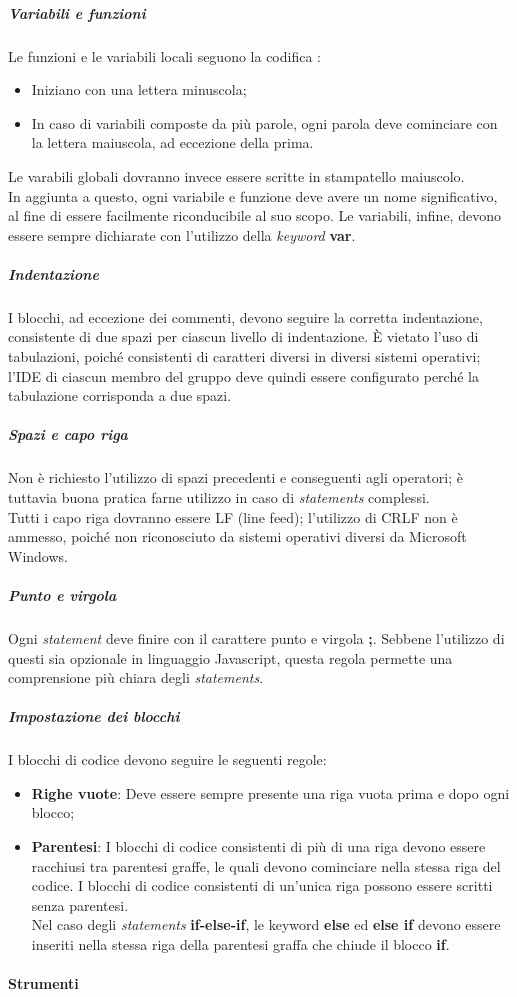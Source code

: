 \documentclass[../norme-di-progetto.tex]{subfiles}
\begin{document}
\subparagraph*{Variabili e funzioni}
Le funzioni e le variabili locali seguono la codifica :
\begin{itemize}
  \item Iniziano con una lettera minuscola;
  \item In caso di variabili composte da più parole, ogni parola deve cominciare con la lettera maiuscola, ad eccezione della prima.
\end{itemize}
Le varabili globali dovranno invece essere scritte in stampatello maiuscolo. \\
In aggiunta a questo, ogni variabile e funzione deve avere un nome significativo, al fine di essere facilmente riconducibile al suo scopo. Le variabili, infine, devono essere sempre dichiarate con l'utilizzo della \textit{keyword} \textbf{var}.

\subparagraph*{Indentazione}
I blocchi, ad eccezione dei commenti, devono seguire la corretta indentazione, consistente di due spazi per ciascun livello di indentazione. È vietato l'uso di tabulazioni, poiché consistenti di caratteri diversi in diversi sistemi operativi; l'IDE di ciascun membro del gruppo deve quindi essere configurato perché la tabulazione corrisponda a due spazi.

\subparagraph*{Spazi e capo riga}
Non è richiesto l'utilizzo di spazi precedenti e conseguenti agli operatori; è tuttavia buona pratica farne utilizzo in caso di \textit{statements} complessi. \\
Tutti i capo riga dovranno essere LF (line feed); l'utilizzo di CRLF non è ammesso, poiché non riconosciuto da sistemi operativi diversi da Microsoft Windows.

\subparagraph*{Punto e virgola}
Ogni \textit{statement} deve finire con il carattere punto e virgola \textbf{;}. Sebbene l'utilizzo di questi sia opzionale in linguaggio Javascript, questa regola permette una comprensione più chiara degli \textit{statements}.

\subparagraph*{Impostazione dei blocchi}
I blocchi di codice devono seguire le seguenti regole:
\begin{itemize}
  \item \textbf{Righe vuote}: Deve essere sempre presente una riga vuota prima e dopo ogni blocco;
  \item \textbf{Parentesi}: I blocchi di codice consistenti di più di una riga devono essere racchiusi tra parentesi graffe, le quali devono cominciare nella stessa riga del codice. I blocchi di codice consistenti di un'unica riga possono essere scritti senza parentesi. \\ Nel caso degli \textit{statements} \textbf{if-else-if}, le keyword \textbf{else} ed \textbf{else if} devono essere inseriti nella stessa riga della parentesi graffa che chiude il blocco \textbf{if}.
\end{itemize}

\paragraph{Strumenti}

\newpage
\end{document}
